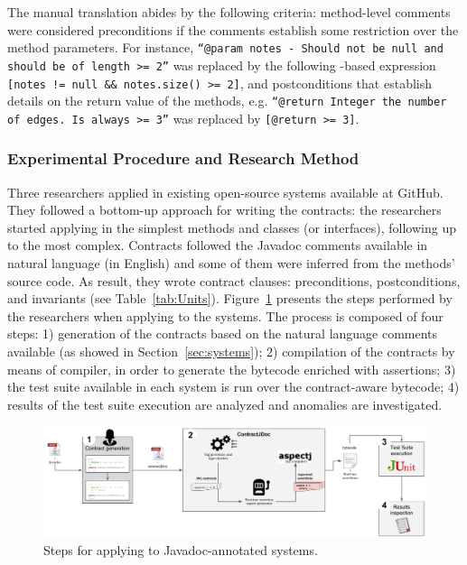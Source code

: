The manual translation abides by the following criteria: method-level comments were considered preconditions
if the comments establish some restriction over the method parameters.
For instance, \texttt{``@param notes - Should not be null and should be of length >= 2''} was
replaced by the following \contractjdoc{}-based expression \texttt{[notes != null \&\& notes.size() >= 2]}, and
postconditions that establish details on the return value of the
methods, e.g. \texttt{``@return Integer the number of edges. Is always >= 3''}
was replaced by \texttt{[@return >= 3]}. 

\subsubsection{Experimental Procedure and Research Method} 

Three researchers applied \contractjdoc{} in \totalSystems{} existing open-source systems
available at GitHub. They followed a bottom-up approach for
writing the \contractjdoc{} contracts: the researchers started applying
\contractjdoc{} in the simplest methods and classes (or interfaces), following
up to the most complex. Contracts followed the Javadoc comments available in
natural language (in English) and some of them were inferred from the methods'
source code.
As result, they wrote \totalClauses{} contract clauses:
\totalPre{} preconditions, \totalPost{} postconditions, and \totalInv{} invariants (see
Table~\ref{tab:Units}).
Figure~\ref{fig:applicationProcess} presents the steps performed by the researchers when applying
\contractjdoc{} to the systems. The process is composed of four steps: 1) generation of the
contracts based on the natural language comments available (as showed in
Section~\ref{sec:systems}); 2) compilation of the contracts by means of
\contractjdocCompiler{} compiler, in order to generate the bytecode enriched
with assertions; 3) the test suite available in each system is run over the
contract-aware bytecode; 4) results of the test suite execution are analyzed and
anomalies are investigated.

\begin{figure}[h]
\centering
\includegraphics[width=1.0\textwidth]{figs/ContractJDocProcess}
\caption{Steps for applying \contractjdoc{} to Javadoc-annotated systems.}
\label{fig:applicationProcess}
\end{figure}

